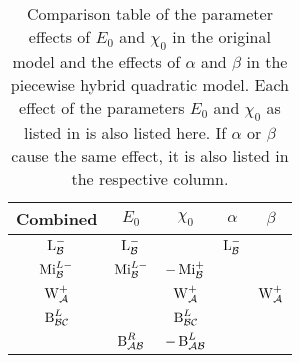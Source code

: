 \begin{table}
	\centering
	\begin{tabular}{|c||c|c||c|c|} \hline
		Combined         & $E_0$            & $\chi_0$          & $\alpha$     & $\beta$        \\ \hline \hline
		$\operatorname{L}_{\mathcal{B}}^{-}$   & $\operatorname{L}_{\mathcal{B}}^{-}$   &                   & $\operatorname{L}_{\mathcal{B}}^-$ &                \\ \hline
		$\operatorname{Mi}_{\mathcal{B}}^{L-}$ & $\operatorname{Mi}_{\mathcal{B}}^{L-}$ & $-\operatorname{Mi}_{\mathcal{B}}^{+}$  &              &                \\ \hline
		$\operatorname{W}_{\mathcal{A}}^{+}$   &                  & $\operatorname{W}_{\mathcal{A}}^{+}$    &              & $\operatorname{W}_{\mathcal{A}}^{+}$ \\ \hline \hline
		$\operatorname{B}_{\mathcal{B}\mathcal{C}}^{L}$ &                  & $\operatorname{B}_{\mathcal{B}\mathcal{C}}^{L}$  &              &                \\ \hline
		                 & $\operatorname{B}_{\mathcal{A}\mathcal{B}}^{R}$ & $-\operatorname{B}_{\mathcal{A}\mathcal{B}}^{L}$ &              &                \\ \hline
	\end{tabular}
	\caption[Comparison table of parameter effects in the piecewise hybrid quadratic model and the original model]{
		Comparison table of the parameter effects of $E_0$ and $\chi_0$ in the original model and the effects of $\alpha$ and $\beta$ in the piecewise hybrid quadratic model.
		Each effect of the parameters $E_0$ and $\chi_0$ as listed in  is also listed here.
		If $\alpha$ or $\beta$ cause the same effect, it is also listed in the respective column.
	}
	\label{table:setup.quad.hybrid.paramfx}
\end{table}
